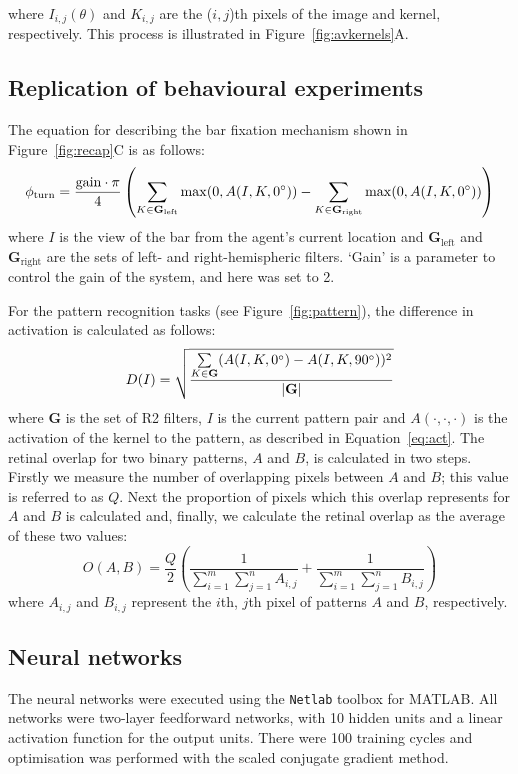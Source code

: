 \documentclass[10pt]{article}
\newcommand{\Matlab}{MATLAB}
\begin{document}
where $I_{i,j}(\theta)$ and $K_{i,j}$ are the ($i,j$)th pixels of the image and kernel, respectively. This process is illustrated in Figure~\ref{fig:avkernels}A.

\subsection*{Replication of behavioural experiments}
\label{sec:methods:replication}
The equation for describing the bar fixation mechanism shown in Figure~\ref{fig:recap}C is as follows:
$$
\phi_\mathrm{turn} = \frac{\mathrm{gain}\cdot \pi}{4}\left( \sum\limits_{K\in \mathbf{G}_\mathrm{left}}\max(0,A(I,K,0\degree)) - \sum\limits_{K\in \mathbf{G}_\mathrm{right}}\max(0,A(I,K,0\degree)) \right)
$$
where $I$ is the view of the bar from the agent's current location and $\mathbf{G}_\mathrm{left}$ and $\mathbf{G}_\mathrm{right}$ are the sets of left- and right-hemispheric filters. `Gain' is a parameter to control the gain of the system, and here was set to 2.

For the pattern recognition tasks (see Figure~\ref{fig:pattern}), the difference in activation is calculated as follows:
$$
D(I) = \sqrt{\frac{\sum\limits_{K\in \mathbf{G}}(A(I,K,0\degree)-A(I,K,90\degree))^2}{|\mathbf{G}|}}
$$
where $\mathbf{G}$ is the set of R2 filters, $I$ is the current pattern pair and $A(\cdot,\cdot,\cdot)$ is the activation of the kernel to the pattern, as described in Equation~\ref{eq:act}.
The retinal overlap for two binary patterns, $A$ and $B$, is calculated in two steps. Firstly we measure the number of overlapping pixels between $A$ and $B$; this value is referred to as $Q$. Next the proportion of pixels which this overlap represents for $A$ and $B$ is calculated and, finally, we calculate the retinal overlap as the average of these two values:
$$
O(A,B) = \frac{Q}{2} \left( \frac{1}{\sum\limits_{i=1}^m \sum\limits_{j=1}^n A_{i,j}} + \frac{1}{\sum\limits_{i=1}^m \sum\limits_{j=1}^n B_{i,j}} \right)
$$
where $A_{i,j}$ and $B_{i,j}$ represent the $i$th, $j$th pixel of patterns $A$ and $B$, respectively.

\subsection*{Neural networks}
\label{sec:methods:neuralnetworks}
The neural networks were executed using the \texttt{Netlab} toolbox for \Matlab.
All networks were two-layer feedforward networks, with 10 hidden units and a linear activation function for the output units.
There were 100 training cycles and optimisation was performed with the scaled conjugate gradient method.
\end{document}
